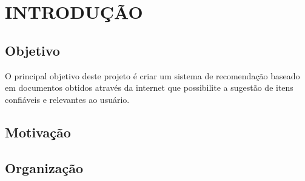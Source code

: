 \chapter{INTRODUÇÃO}  %

\section{Objetivo} %
\label{sec:objetivo}

 O principal objetivo deste projeto é criar um sistema de recomendação baseado em documentos obtidos através da internet que possibilite a sugestão de itens confiáveis e relevantes ao usuário.


\section{Motivação} %
\label{sec:motivação}




\section{Organização} %
\label{sec:organização}




